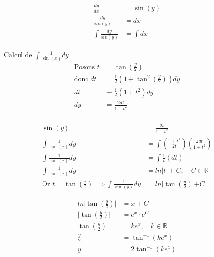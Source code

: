 \begin{align*}
	\frac{dy}{dx} &= \sin(y) \\
	\frac{dy}{sin(y)} &= dx \\
	\int \frac {dy}{sin(y)} &= \int dx \\
\end{align*}

$\text{Calcul de } \int \frac{1}{\sin(x)} dy$ \\
\begin{align*}
\text{Posons } t &= \tan(\frac{y}{2}) \\
\text{donc } dt &= \frac{1}{2}(1 + \tan^2(\frac{y}{2}))dy \\
dt &= \frac{1}{2}(1 + t^2)dy \\ dy &= \frac{2dt}{1+t^2} \\	
\end{align*}


\begin{align*}
	\sin(y) &= \frac{2t}{1 + t^2} \\
	\int \frac{1}{\sin(y)} dy &= \int (\frac{1+t^2}{2t}) (\frac{2dt}{1+t^2}) \\
	\int \frac{1}{\sin(y)} dy &= \int \frac{1}{t} ({dt}) \\
	\int \frac{1}{\sin(y)} dy &= ln|t| + C, \quad C \in \mathbb{R} \\
	\text{Or } t = \tan(\frac{y}{2}) \implies \int \frac{1}{\sin(y)} dy &= ln \lvert \tan(\frac{y}{2}) \lvert + C
\end{align*}

\begin{align*}
	ln \lvert \tan(\frac{y}{2}) \lvert &= x + C \\
	\lvert \tan(\frac{y}{2}) \lvert &= e^x \cdot e^C \\
	\tan(\frac{y}{2}) &= ke^x, \quad k \in \mathbb{R} \\
	 \frac{y}{2} &= \tan^{-1} (ke^x) \\
	 y &= 2 \tan^{-1} (ke^x) \\
\end{align*}
